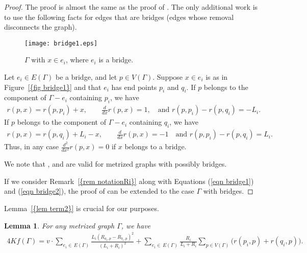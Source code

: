 \documentclass[12pt]{amsart}
\newtheorem{lemma}[theorem]{Lemma}
\theoremstyle{example}
\theoremstyle{definition}
\theoremstyle{notation}
\begin{document}
\begin{proof}
The proof is almost the same as the proof of \cite[Lemma 3.10]{C7}. The only additional work is to use the following facts for edges that are bridges (edges whose removal disconnects the graph).

\begin{figure}
\centering
\texttt{[image: bridge1.eps]} \caption{ ${\Gamma}$ with $x \in e_i$, where $e_i$ is a bridge.} \label{fig bridge1}
\end{figure}
Let $e_i \in {E({\Gamma})}$ be a bridge, and let $p \in {V({\Gamma})}$. Suppose $x \in e_i$ is as in {Figure~\ref{{fig bridge1}}} and that $e_i$ has end points ${p_{i}}$ and ${q_{i}}$.
If $p$ belongs to the component of ${\Gamma}-e_i$ containing ${p_{i}}$, we have
\begin{equation}\label{eqn bridge1}
\begin{split}
r(p,x)=r(p,{p_{i}})+x, \qquad \frac{d}{dx}r(p,x)=1, \quad \text{and  } r(p,{p_{i}})-r(p,{q_{i}})=-{L_{i}}.
\end{split}
\end{equation}
If $p$ belongs to the component of ${\Gamma}-e_i$ containing ${q_{i}}$, we have
\begin{equation}\label{eqn bridge2}
\begin{split}
r(p,x)=r(p,{q_{i}})+{L_{i}}-x, \qquad \frac{d}{dx}r(p,x)=-1 \quad \text{and  } r(p,{p_{i}})-r(p,{q_{i}})={L_{i}}.
\end{split}
\end{equation}
Thus, in any case $\frac{d^2}{dx^2}r(p,x)=0$ if $x$ belongs to a bridge.

We note that \cite[Lemma 3.6]{C7}, \cite[Equation (14)]{C7} and \cite[Proposition 3.9]{C7} are valid
for metrized graphs with possibly bridges.

If we consider {Remark~\ref{{rem notationRi}}} along with Equations (\ref{eqn bridge1}) and (\ref{eqn bridge2}),
the proof of \cite[Lemma 3.10]{C7} can be extended to the case ${\Gamma}$ with bridges.
\end{proof}
{Lemma~\ref{{lem term2}}} is crucial for our purposes.
\begin{lemma}\label{lem kirchhoff and term2}
For any metrized graph ${\Gamma}$, we have
\begin{equation*}\label{eqn kirchhoff and term2}
\begin{split}
4Kf({\Gamma})=v \cdot \sum_{e_i \in \,
{E({\Gamma})}}\frac{{L_{i}}(R_{a_{i},p}-R_{b_{i},p})^2}{({L_{i}}+{R_{i}})^2}
+ \sum_{e_i \in \,
{E({\Gamma})}}\frac{R_{i}}{{L_{i}} + {R_{i}}} \sum_{p \in {V({\Gamma})}}\big(r({p_{i}},p)+r({q_{i}},p)\big).
\end{split}
\end{equation*}
\end{lemma}
\end{document}
